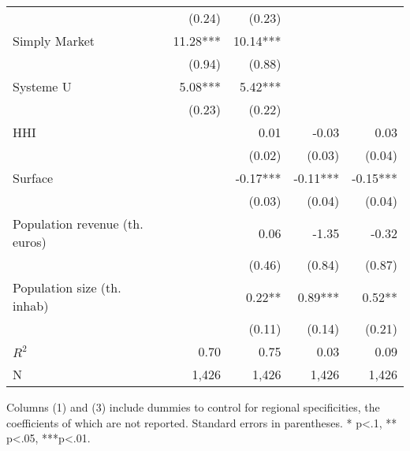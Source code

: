 \documentclass[english]{article}
\begin{document}
\begin{table}[htbp]
\begin{threeparttable}
\begin{tabular}{lrrrr}
                                                        & (0.24)    & (0.23)   &           &            \\
Simply Market                                           & 11.28***  & 10.14*** &           &            \\
                                                        & (0.94)    & (0.88)   &           &            \\
Systeme U                                               & 5.08***   & 5.42***  &           &            \\
                                                        & (0.23)    & (0.22)   &           &            \\
HHI                                                     &           & 0.01     & -0.03     & 0.03       \\
                                                        &           & (0.02)   & (0.03)    & (0.04)     \\
Surface                                                 &           & -0.17*** & -0.11***  & -0.15***   \\
                                                        &           & (0.03)   & (0.04)    & (0.04)     \\
Population revenue (th. euros)                          &           & 0.06     & -1.35     & -0.32      \\
                                                        &           & (0.46)   & (0.84)    & (0.87)     \\
Population size (th. inhab)                             &           & 0.22**   & 0.89***   & 0.52**     \\
                                                        &           & (0.11)   & (0.14)    & (0.21)     \\
\midrule
$R^2$                                                      & 0.70      & 0.75     & 0.03      & 0.09       \\
N                                                       & 1,426     & 1,426    & 1,426     & 1,426      \\
\bottomrule
\bottomrule
\end{tabular}
\begin{tablenotes}
      \small
      \item Columns (1) and (3) include dummies to control for regional specificities, the coefficients of which are not reported. Standard errors in parentheses. * p<.1, ** p<.05, ***p<.01.
\end{tablenotes}
\end{threeparttable}
\end{table}
\end{document}
